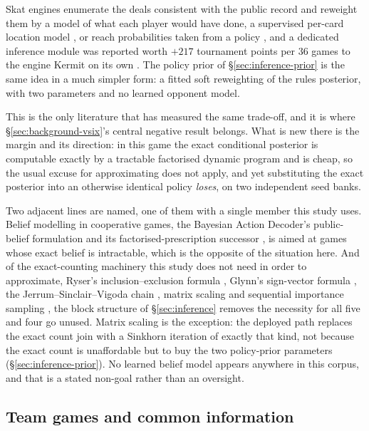Skat engines enumerate the deals consistent with the public record and reweight them by a model of
what each player would have done, a supervised per-card location model
\cite{solinas-supervised}, or reach probabilities taken from a policy \cite{rebstock-inference}, and a dedicated inference module was reported worth $+217$ tournament points per 36 games to the
engine Kermit on its own \cite{buro-kermit}. The policy prior of \S\ref{sec:inference-prior} is the
same idea in a much simpler form: a fitted soft reweighting of the rules posterior, with two
parameters and no learned opponent model.

This is the only literature that has measured the same trade-off, and it is where
\S\ref{sec:background-vsix}'s central negative result belongs. What is new there is the margin and
its direction: in this game the exact conditional posterior is computable exactly by a tractable
factorised dynamic program and is cheap,
so the usual excuse for approximating does not apply, and yet substituting the exact posterior
into an otherwise identical policy \emph{loses}, on two independent seed banks.

Two adjacent lines are named, one of them with a single member this study uses. Belief modelling in cooperative games, the Bayesian
Action Decoder's public-belief formulation \cite{foerster2019bad} and its factorised-prescription
successor \cite{sokota2021capi}, is aimed at games whose exact belief is intractable, which is the
opposite of the situation here. And of the exact-counting machinery this study does not need in order to
approximate, Ryser's inclusion--exclusion formula \cite{ryser}, Glynn's sign-vector formula
\cite{glynn}, the Jerrum--Sinclair--Vigoda chain \cite{jsv}, matrix scaling \cite{lsw} and
sequential importance sampling \cite{chen-sis}, the block structure of \S\ref{sec:inference}
removes the necessity for all five and four go unused. Matrix scaling is the exception: the deployed
path replaces the exact count join with a Sinkhorn iteration of exactly that kind, not because the
exact count is unaffordable but to buy the two policy-prior parameters
(\S\ref{sec:inference-prior}). No learned belief model appears anywhere in this corpus, and that is a
stated non-goal rather than an oversight.

\subsection{Team games and common information}
\label{sec:related-team}

